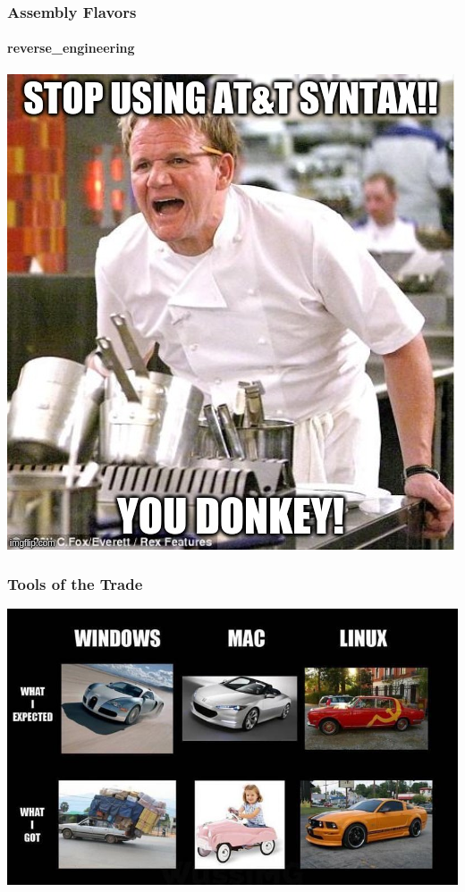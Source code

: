 \documentclass[aspectratio=169]{beamer}
\begin{document}
\begin{frame}
  \frametitle{Assembly Flavors}
  \framesubtitle{reverse\_engineering}
  \begin{center}
    \includegraphics[scale=0.35]{intel-vs-atnt-meme}
  \end{center}
\end{frame}

\begin{frame}
  \frametitle{Tools of the Trade}
  \begin{center}
    \includegraphics[scale=0.5]{mac-meme}
  \end{center}
\end{frame}
\end{document}
